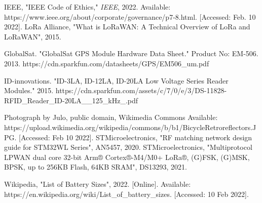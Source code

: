 \documentclass{article}
\begin{document}
\begin{thebibliography}{}
	 IEEE, "IEEE Code of Ethics," \textit{IEEE}, 2022. Available: https://www.ieee.org/about/corporate/governance/p7-8.html. [Accessed: Feb. 10 2022].
	 LoRa Alliance, "What is LoRaWAN: A Technical Overview of LoRa and LoRaWAN", 2015.
	
	 GlobalSat. "GlobalSat GPS Module Hardware Data Sheet." Product No: EM-506. 2013. https://cdn.sparkfun.com/datasheets/GPS/EM506\_um.pdf
	
	 ID-innovations. "ID-3LA, ID-12LA, ID-20LA Low Voltage Series Reader Modules." 2015. https://cdn.sparkfun.com/assets/c/7/0/e/3/DS-11828-RFID\_Reader\_ID-20LA\_\_125\_kHz\_.pdf
	
	 Photograph by Julo, public domain, Wikimedia Commons Available: https://upload.wikimedia.org/wikipedia/commons/b/b1/BicycleRetroreflectors.JPG. [Accessed: Feb 10 2022]. 
	 STMicroelectronics, "RF matching network design guide for STM32WL Series", AN5457, 2020. 
	 STMicroelectronics, "Multiprotocol LPWAN dual core 32-bit Arm® Cortex®-M4/M0+	LoRa®, (G)FSK, (G)MSK, BPSK, up to 256KB Flash, 64KB SRAM", DS13293, 2021.
	
	
	
	 Wikipedia, "List of Battery Sizes", 2022. [Online]. Available: https://en.wikipedia.org/wiki/List\_of\_battery\_sizes. [Accessed: 10 Feb 2022]. 
	
	
	
\end{thebibliography}
\end{document}
